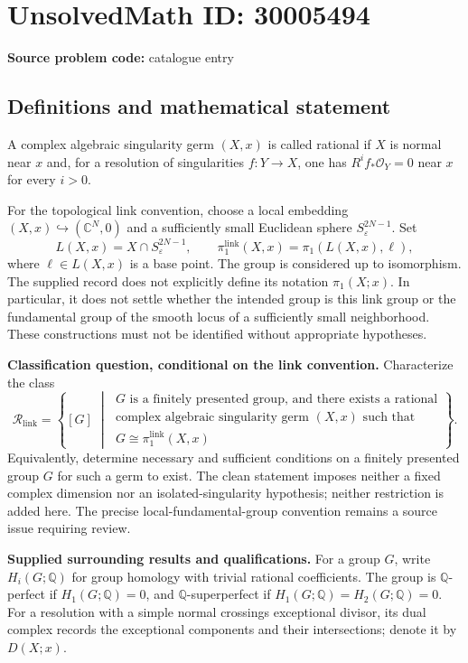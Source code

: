 \documentclass[11pt]{article}
\newcommand{\Q}{\mathbb{Q}}
\newcommand{\C}{\mathbb{C}}
\begin{document}
\section*{UnsolvedMath ID: 30005494}
\textbf{Source problem code:} catalogue entry
\subsection{Definitions and mathematical statement}
A complex algebraic singularity germ \((X,x)\) is called rational if \(X\) is normal near \(x\) and, for a resolution of singularities \(f\colon Y\to X\), one has \(R^i f_*\mathcal O_Y=0\) near \(x\) for every \(i>0\).

For the topological link convention, choose a local embedding \((X,x)\hookrightarrow(\C^N,0)\) and a sufficiently small Euclidean sphere \(S^{2N-1}_\varepsilon\). Set
\[
L(X,x)=X\cap S^{2N-1}_\varepsilon,
\qquad
\pi_1^{\mathrm{link}}(X,x)=\pi_1(L(X,x),\ell),
\]
where \(\ell\in L(X,x)\) is a base point. The group is considered up to isomorphism. The supplied record does not explicitly define its notation \(\pi_1(X;x)\). In particular, it does not settle whether the intended group is this link group or the fundamental group of the smooth locus of a sufficiently small neighborhood. These constructions must not be identified without appropriate hypotheses.

\textbf{Classification question, conditional on the link convention.} Characterize the class
\[
\mathcal R_{\mathrm{link}}=
\left\{[G]\;\middle|\;
\begin{gathered}
G\text{ is a finitely presented group, and there exists a rational}\\
\text{complex algebraic singularity germ }(X,x)\text{ such that}\\
G\cong\pi_1^{\mathrm{link}}(X,x)
\end{gathered}
\right\}.
\]
Equivalently, determine necessary and sufficient conditions on a finitely presented group \(G\) for such a germ to exist. The clean statement imposes neither a fixed complex dimension nor an isolated-singularity hypothesis; neither restriction is added here. The precise local-fundamental-group convention remains a source issue requiring review.

\textbf{Supplied surrounding results and qualifications.} For a group \(G\), write \(H_i(G;\Q)\) for group homology with trivial rational coefficients. The group is \(\Q\)-perfect if \(H_1(G;\Q)=0\), and \(\Q\)-superperfect if \(H_1(G;\Q)=H_2(G;\Q)=0\). For a resolution with a simple normal crossings exceptional divisor, its dual complex records the exceptional components and their intersections; denote it by \(D(X;x)\).
\end{document}
